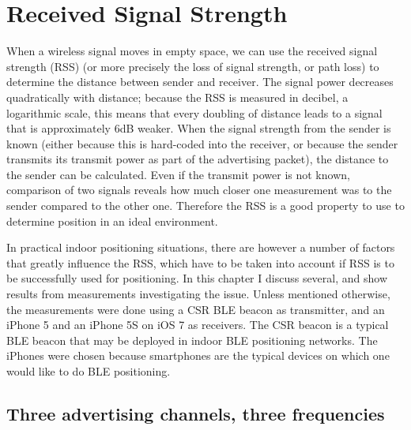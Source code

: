 \chapter{Received Signal Strength}



When a wireless signal moves in empty space, we can use the received signal strength (RSS) (or more precisely the loss of signal strength, or path loss) to determine the distance between sender and receiver.
The signal power decreases quadratically with distance; because the RSS is measured in decibel, a logarithmic scale, this means that every doubling of distance leads to a signal that is approximately 6dB weaker.
When the signal strength from the sender is known (either because this is hard-coded into the receiver, or because the sender transmits its transmit power as part of the advertising packet), the distance to the sender can be calculated.
Even if the transmit power is not known, comparison of two signals reveals how much closer one measurement was to the sender compared to the other one.
Therefore the RSS is a good property to use to determine position in an ideal environment.

In practical indoor positioning situations, there are however a number of factors that greatly influence the RSS, which have to be taken into account if RSS is to be successfully used for positioning.
In this chapter I discuss several, and show results from measurements investigating the issue.
Unless mentioned otherwise, the measurements were done using a CSR BLE beacon as transmitter, and an iPhone 5 and an iPhone 5S on iOS 7 as receivers.
The CSR beacon is a typical BLE beacon that may be deployed in indoor BLE positioning networks.
The iPhones were chosen because smartphones are the typical devices on which one would like to do BLE positioning.

\section{Three advertising channels, three frequencies}



